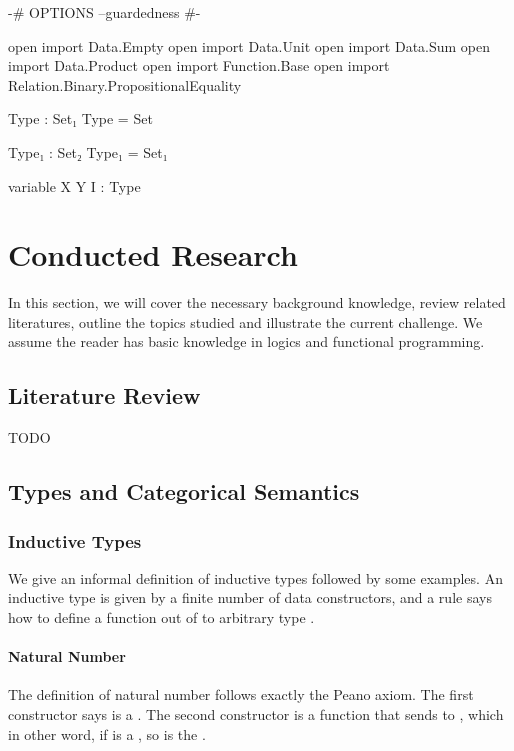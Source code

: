 \begin{code}[hide]
{-# OPTIONS --guardedness #-}

open import Data.Empty
open import Data.Unit
open import Data.Sum
open import Data.Product
open import Function.Base
open import Relation.Binary.PropositionalEquality

Type : Set₁
Type = Set

Type₁ : Set₂
Type₁ = Set₁

variable X Y I : Type
\end{code}

\chapter{Conducted Research}

In this section, we will cover the necessary background knowledge, review related literatures, outline the topics studied and illustrate the current challenge. We assume the reader has basic knowledge in logics and functional programming.




\section{Literature Review}

TODO

\section{Types and Categorical Semantics}

\subsection{Inductive Types}

We give an informal definition of inductive types followed by some examples. An inductive type  is given by a finite number of data constructors, and a rule says how to define a function out of  to arbitrary type .

\subsubsection*{Natural Number}

The definition of natural number  follows exactly the Peano axiom. The first constructor says  is a . The second constructor is a function that sends  to , which in other word, if  is a , so is the . 

